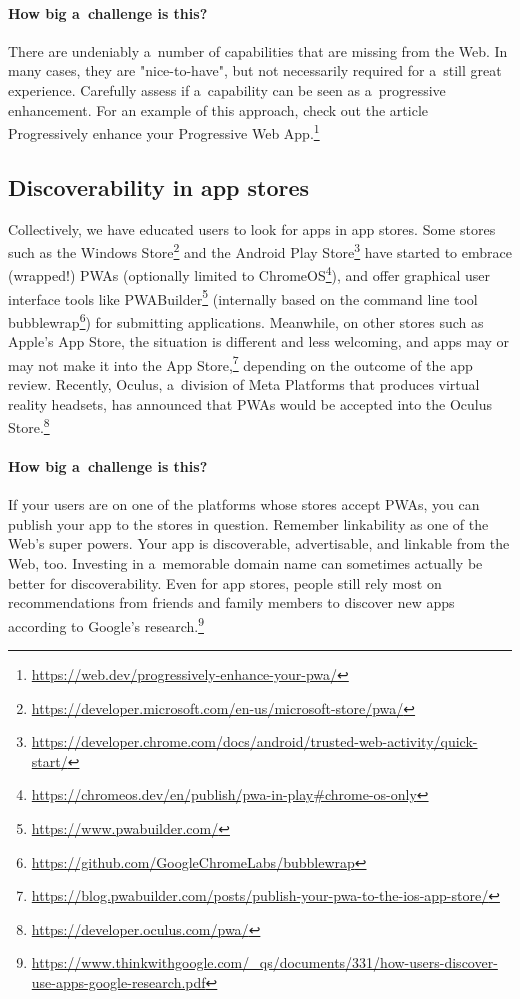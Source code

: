 \documentclass[sigconf]{acmart}
\begin{document}
\paragraph{How big a~challenge is this?}

There are undeniably a~number of capabilities that are missing from the Web. In many cases, they are "nice-to-have", but not necessarily required for a~still great experience. Carefully assess if a~capability can be seen as a~progressive enhancement. For an example of this approach, check out the article Progressively enhance your Progressive Web App.\footnote{\url{https://web.dev/progressively-enhance-your-pwa/}}

\subsection{Discoverability in app stores}

Collectively, we have educated users to look for apps in app stores. Some stores such as the Windows Store\footnote{\url{https://developer.microsoft.com/en-us/microsoft-store/pwa/}} and the Android Play Store\footnote{\url{https://developer.chrome.com/docs/android/trusted-web-activity/quick-start/}} have started to embrace (wrapped!) PWAs (optionally limited to ChromeOS\footnote{\url{https://chromeos.dev/en/publish/pwa-in-play\#chrome-os-only}}), and offer graphical user interface tools like PWABuilder\footnote{\url{https://www.pwabuilder.com/}} (internally based on the command line tool bubblewrap\footnote{\url{https://github.com/GoogleChromeLabs/bubblewrap}}) for submitting applications. Meanwhile, on other stores such as Apple's App Store, the situation is different and less welcoming, and apps may or may not make it into the App Store,\footnote{\url{https://blog.pwabuilder.com/posts/publish-your-pwa-to-the-ios-app-store/}} depending on the outcome of the app review. Recently, Oculus, a~division of Meta Platforms that produces virtual reality headsets, has announced that PWAs would be accepted into the Oculus Store.\footnote{\url{https://developer.oculus.com/pwa/}}

\paragraph{How big a~challenge is this?}

If your users are on one of the platforms whose stores accept PWAs, you can publish your app to the stores in question. Remember linkability as one of the Web's super powers. Your app is discoverable, advertisable, and linkable from the Web, too. Investing in a~memorable domain name can sometimes actually be better for discoverability. Even for app stores, people still rely most on recommendations from friends and family members to discover new apps according to Google's research.\footnote{\url{https://www.thinkwithgoogle.com/_qs/documents/331/how-users-discover-use-apps-google-research.pdf}}
\end{document}
